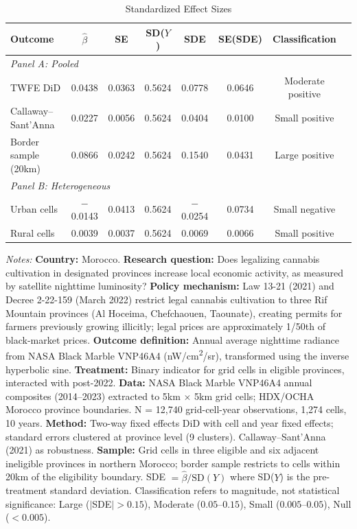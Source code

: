\begin{table}[H]
\centering
\caption{Standardized Effect Sizes}
\begin{threeparttable}
\small
\begin{tabular}{lccccccl}
\toprule
Outcome & $\hat{\beta}$ & SE & SD($Y$) & SDE & SE(SDE) & Classification \\
\midrule
\multicolumn{7}{l}{\textit{Panel A: Pooled}} \\
TWFE DiD & 0.0438 & 0.0363 & 0.5624 & 0.0778 & 0.0646 & Moderate positive \\
Callaway--Sant'Anna & 0.0227 & 0.0056 & 0.5624 & 0.0404 & 0.0100 & Small positive \\
Border sample (20km) & 0.0866 & 0.0242 & 0.5624 & 0.1540 & 0.0431 & Large positive \\
\midrule
\multicolumn{7}{l}{\textit{Panel B: Heterogeneous}} \\
Urban cells & $-$0.0143 & 0.0413 & 0.5624 & $-$0.0254 & 0.0734 & Small negative \\
Rural cells & 0.0039 & 0.0037 & 0.5624 & 0.0069 & 0.0066 & Small positive \\
\bottomrule
\end{tabular}
\begin{tablenotes}[flushleft]
\scriptsize
\item \textit{Notes:} \textbf{Country:} Morocco. \textbf{Research question:} Does legalizing cannabis cultivation in designated provinces increase local economic activity, as measured by satellite nighttime luminosity? \textbf{Policy mechanism:} Law 13-21 (2021) and Decree 2-22-159 (March 2022) restrict legal cannabis cultivation to three Rif Mountain provinces (Al Hoceima, Chefchaouen, Taounate), creating permits for farmers previously growing illicitly; legal prices are approximately 1/50th of black-market prices. \textbf{Outcome definition:} Annual average nighttime radiance from NASA Black Marble VNP46A4 (nW/cm\textsuperscript{2}/sr), transformed using the inverse hyperbolic sine. \textbf{Treatment:} Binary indicator for grid cells in eligible provinces, interacted with post-2022. \textbf{Data:} NASA Black Marble VNP46A4 annual composites (2014--2023) extracted to 5km $\times$ 5km grid cells; HDX/OCHA Morocco province boundaries. N = 12,740 grid-cell-year observations, 1,274 cells, 10 years. \textbf{Method:} Two-way fixed effects DiD with cell and year fixed effects; standard errors clustered at province level (9 clusters). Callaway--Sant'Anna (2021) as robustness. \textbf{Sample:} Grid cells in three eligible and six adjacent ineligible provinces in northern Morocco; border sample restricts to cells within 20km of the eligibility boundary. SDE $= \hat{\beta} / \text{SD}(Y)$ where SD($Y$) is the pre-treatment standard deviation. Classification refers to magnitude, not statistical significance: Large ($|$SDE$| > 0.15$), Moderate ($0.05$--$0.15$), Small ($0.005$--$0.05$), Null ($< 0.005$).
\end{tablenotes}
\end{threeparttable}
\label{tab:sde}
\end{table}
